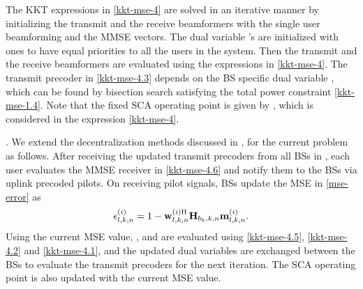 The \ac{KKT} expressions in \eqref{kkt-mse-4} are solved in an iterative manner by initializing the transmit and the receive beamformers  with the single user beamforming and the \ac{MMSE} vectors. The dual variable \me{\alpha}'s are initialized with ones to have equal priorities to all the users in the system. Then the transmit and the receive beamformers are evaluated using the expressions in \eqref{kkt-mse-4}. The transmit precoder in \eqref{kkt-mse-4.3} depends on the \ac{BS} specific dual variable , which can be found by bisection search satisfying the total power constraint \eqref{kkt-mse-1.4}. Note that the fixed \ac{SCA} operating point is given by , which is considered in the expression \eqref{kkt-mse-4}.

. We extend the decentralization methods discussed in \cite{komulainen2013effective}, for the current problem as follows. After receiving the updated transmit precoders from all \acp{BS} in , each user evaluates the \ac{MMSE} receiver in \eqref{kkt-mse-4.6} and notify them to the \acp{BS} via uplink precoded pilots. On receiving pilot signals, \acp{BS} update the \ac{MSE} in \eqref{mse-error} as 
\begin{equation}
\epsilon_{l,k,n}^{(i)} = 1 - \mathbf{w}_{l,k,n}^{(i)\mathrm{H}} \mathbf{H}_{b_k,k,n} \mathbf{m}_{l,k,n}^{(i)}.
\end{equation}
Using the current \ac{MSE} value, , and  are evaluated using \eqref{kkt-mse-4.5}, \eqref{kkt-mse-4.2} and \eqref{kkt-mse-4.1}, and the updated dual variables  are exchanged between the \acp{BS} to evaluate the transmit precoders  for the next iteration. The \ac{SCA} operating point is also updated with the current \ac{MSE} value.

